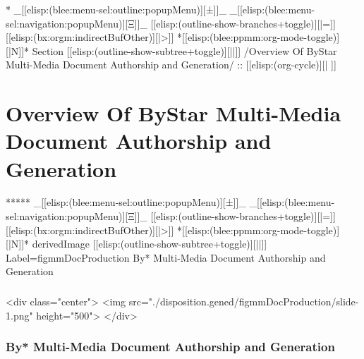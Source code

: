 \begin{whenOrg}
\begin{whenOrg}
*  _[[elisp:(blee:menu-sel:outline:popupMenu)][±]]_ _[[elisp:(blee:menu-sel:navigation:popupMenu)][Ξ]]_ [[elisp:(outline-show-branches+toggle)][|=]] [[elisp:(bx:orgm:indirectBufOther)][|>]] *[[elisp:(blee:ppmm:org-mode-toggle)][|N]]*  Section    [[elisp:(outline-show-subtree+toggle)][||]]   /Overview Of ByStar Multi-Media Document Authorship and Generation/ ::  [[elisp:(org-cycle)][| ]]
\end{whenOrg}

\section{Overview Of ByStar Multi-Media Document Authorship and Generation}


\begin{whenOrg}
*****  _[[elisp:(blee:menu-sel:outline:popupMenu)][±]]_ _[[elisp:(blee:menu-sel:navigation:popupMenu)][Ξ]]_ [[elisp:(outline-show-branches+toggle)][|=]] [[elisp:(bx:orgm:indirectBufOther)][|>]] *[[elisp:(blee:ppmm:org-mode-toggle)][|N]]*  derivedImage [[elisp:(outline-show-subtree+toggle)][||]] Label=figmmDocProduction By* Multi-Media Document Authorship and Generation
\end{whenOrg}

\begin{htmlonly}

\begin{frame}[fragile,plain,label=figmmDocProduction]
    \frametitle{}
    \framesubtitle{}
    \begin{rawhtml}
<div class="center">
<img src="./disposition.gened/figmmDocProduction/slide-1.png" height="500">
</div>
    \end{rawhtml}
\end{frame}
\end{htmlonly}

\begin{verblatex}

\begin{frame}[fragile,plain,label=figmmDocProduction]
    \frametitle{By* Multi-Media Document Authorship and Generation}
    \framesubtitle{}


\end{frame}
\end{verblatex}
\end{whenOrg}
